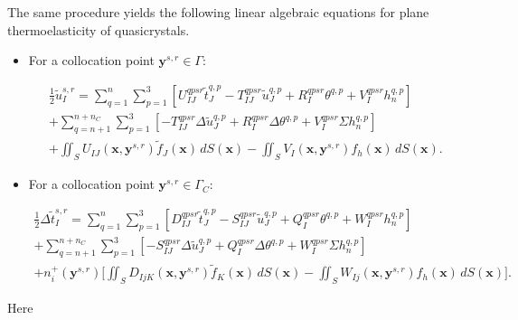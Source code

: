 The same procedure yields the following linear algebraic equations
for plane thermoelasticity of quasicrystals.

\begin{itemize}
	
	\item For a collocation point $\mathbf{y}^{s,r}\in\Gamma$:
	
	\begin{multline}
		\frac{1}{2}\tilde{u}_{I}^{s,r}
		=
		\sum_{q=1}^{n}\sum_{p=1}^{3}
		\left[
		U_{IJ}^{qpsr}\tilde{t}_{J}^{q,p}
		-
		T_{IJ}^{qpsr}\tilde{u}_{J}^{q,p}
		+
		R_{I}^{qpsr}\theta^{q,p}
		+
		V_{I}^{qpsr}h_{n}^{q,p}
		\right]
		\\
		+
		\sum_{q=n+1}^{n+n_{C}}\sum_{p=1}^{3}
		\left[
		-
		T_{IJ}^{qpsr}\Delta\tilde{u}_{J}^{q,p}
		+
		R_{I}^{qpsr}\Delta\theta^{q,p}
		+
		V_{I}^{qpsr}\Sigma h_{n}^{q,p}
		\right]
		\\
		+
		\iint_{S}
		U_{IJ}(\mathbf{x},\mathbf{y}^{s,r})
		\tilde{f}_{J}(\mathbf{x})
		\,dS(\mathbf{x})
		-
		\iint_{S}
		V_{I}(\mathbf{x},\mathbf{y}^{s,r})
		f_{h}(\mathbf{x})
		\,dS(\mathbf{x}).
		\label{KushnirEq20}
	\end{multline}
	
	\item For a collocation point $\mathbf{y}^{s,r}\in\Gamma_{C}$:
	
	\begin{multline}
		\frac{1}{2}\Delta\tilde{t}_{I}^{s,r}
		=
		\sum_{q=1}^{n}\sum_{p=1}^{3}
		\left[
		D_{IJ}^{qpsr}\tilde{t}_{J}^{q,p}
		-
		S_{IJ}^{qpsr}\tilde{u}_{J}^{q,p}
		+
		Q_{I}^{qpsr}\theta^{q,p}
		+
		W_{I}^{qpsr}h_{n}^{q,p}
		\right]
		\\
		+
		\sum_{q=n+1}^{n+n_{C}}\sum_{p=1}^{3}
		\left[
		-
		S_{IJ}^{qpsr}\Delta\tilde{u}_{J}^{q,p}
		+
		Q_{I}^{qpsr}\Delta\theta^{q,p}
		+
		W_{I}^{qpsr}\Sigma h_{n}^{q,p}
		\right]
		\\
		+
		n_{i}^{+}(\mathbf{y}^{s,r})
		\bigg[
		\iint_{S}
		D_{IjK}(\mathbf{x},\mathbf{y}^{s,r})
		\tilde{f}_{K}(\mathbf{x})
		\,dS(\mathbf{x})
		-
		\iint_{S}
		W_{Ij}(\mathbf{x},\mathbf{y}^{s,r})
		f_{h}(\mathbf{x})
		\,dS(\mathbf{x})
		\bigg].
		\label{KushnirEq21}
	\end{multline}
	
\end{itemize}

Here

